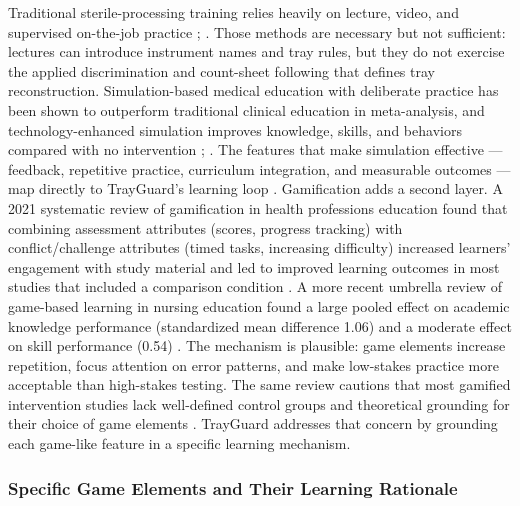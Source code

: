 \documentclass[10pt,a4paper]{article}
\begin{document}
Traditional sterile-processing training relies heavily on lecture, video, and
supervised on-the-job practice \cite{aorn-staffing-shortage-2025};
\cite{hspa-crcst-accessed-2026}. Those
methods are necessary but not sufficient: lectures can introduce instrument
names and tray rules, but they do not exercise the applied discrimination and
count-sheet following that defines tray reconstruction. Simulation-based
medical education with deliberate practice has been shown to outperform
traditional clinical education in meta-analysis, and technology-enhanced
simulation improves knowledge, skills, and behaviors compared with no
intervention \cite{cook-et-al-2011};
\cite{mcgaghie-et-al-2011}. The features that
make simulation effective — feedback, repetitive practice, curriculum
integration, and measurable outcomes — map directly to TrayGuard's learning
loop \cite{issenberg-et-al-2005}.
Gamification adds a second layer. A 2021 systematic review of gamification in
health professions education found that combining assessment attributes (scores,
progress tracking) with conflict/challenge attributes (timed tasks, increasing
difficulty) increased learners' engagement with study material and led to
improved learning outcomes in most studies that included a comparison condition
\cite{van-gaalen-et-al-2021}. A more
recent umbrella review of game-based learning in nursing education found a
large pooled effect on academic knowledge performance (standardized mean
difference 1.06) and a moderate effect on skill performance (0.54)
\cite{malicki-et-al-2025}. The mechanism is
plausible: game elements increase repetition, focus attention on error patterns,
and make low-stakes practice more acceptable than high-stakes testing.
The same review
cautions that most gamified intervention studies lack well-defined control
groups and theoretical grounding for their choice of game elements
\cite{van-gaalen-et-al-2021}. TrayGuard
addresses that concern by grounding each game-like feature in a specific
learning mechanism.
\subsubsection{Specific Game Elements and Their Learning Rationale}
\end{document}
